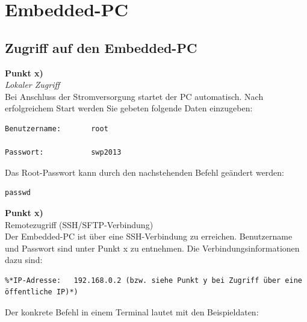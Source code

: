 \documentclass[fontsize = 12pt, paper = a4]{scrreprt}
\begin{document}
\section{Embedded-PC}

\subsection{Zugriff auf den Embedded-PC}

\textbf{Punkt x)} \\

\textit{Lokaler Zugriff} \\

Bei Anschluss der Stromversorgung startet der PC automatisch.
Nach erfolgreichem Start werden Sie gebeten folgende Daten einzugeben:

\vspace*{4mm}
\begin{lstlisting}[frame=single]
Benutzername:		root

Passwort:		    swp2013

\end{lstlisting} 
\vspace*{-2mm}

Das Root-Passwort kann durch den nachstehenden Befehl geändert werden:

\vspace*{4mm}
\begin{lstlisting}[frame=single]
passwd
\end{lstlisting} 
\vspace*{-2mm}

\textbf{Punkt x)} \\

Remotezugriff (SSH/SFTP-Verbindung) \\

Der Embedded-PC ist über eine SSH-Verbindung zu erreichen. 
Benutzername und Passwort sind unter Punkt x zu entnehmen. 
Die Verbindungsinformationen dazu sind:

\vspace*{4mm}
\begin{lstlisting}[frame=single]
%*Port:  		22 *)
%*IP-Adresse: 	192.168.0.2 (bzw. siehe Punkt y bei Zugriff über eine öffentliche IP)*)

\end{lstlisting} 
\vspace*{-2mm}

Der konkrete Befehl in einem Terminal lautet mit den Beispieldaten:
\end{document}
